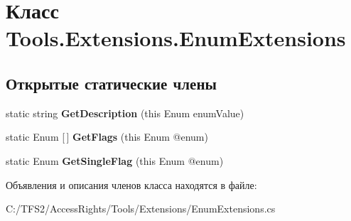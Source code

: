 \hypertarget{class_tools_1_1_extensions_1_1_enum_extensions}{}\section{Класс Tools.\+Extensions.\+Enum\+Extensions}
\label{class_tools_1_1_extensions_1_1_enum_extensions}
\subsection*{Открытые статические члены}
\begin{DoxyCompactItemize}
\item 
\mbox{\label{class_tools_1_1_extensions_1_1_enum_extensions_a5cbe96183a610b55b354bf636891f4bb}} 
static string {\bfseries Get\+Description} (this Enum enum\+Value)
\item 
\mbox{\label{class_tools_1_1_extensions_1_1_enum_extensions_a9f98b6e4b0a6a6e77a763dd565a21d7f}} 
static Enum \mbox{[}$\,$\mbox{]} {\bfseries Get\+Flags} (this Enum @enum)
\item 
\mbox{\label{class_tools_1_1_extensions_1_1_enum_extensions_a1512e5f359770c4cbe085d736f61ec5b}} 
static Enum {\bfseries Get\+Single\+Flag} (this Enum @enum)
\end{DoxyCompactItemize}


Объявления и описания членов класса находятся в файле\+:\begin{DoxyCompactItemize}
\item 
C\+:/\+T\+F\+S2/\+Access\+Rights/\+Tools/\+Extensions/Enum\+Extensions.\+cs\end{DoxyCompactItemize}
